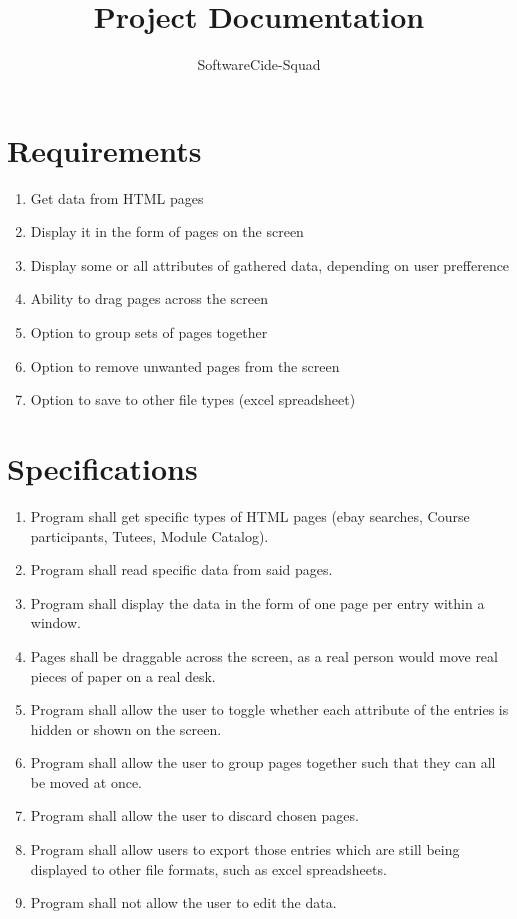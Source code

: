 \documentclass[12pt]{article}
\begin{document}
\title{Project Documentation}
\author{SoftwareCide-Squad}
\maketitle

\section{Requirements}
\begin{enumerate}
\item Get data from HTML pages
\item Display it in the form of pages on the screen
\item Display some or all attributes of gathered data, depending on user prefference
\item Ability to drag pages across the screen
\item Option to group sets of pages together
\item Option to remove unwanted pages from the screen
\item Option to save to other file types (excel spreadsheet)
\end{enumerate}

\section{Specifications}
\begin{enumerate}
\item Program shall get specific types of HTML pages (ebay searches, Course participants, Tutees, Module Catalog).
\item Program shall read specific data from said pages.
\item Program shall display the data in the form of one page per entry within a window.
\item Pages shall be draggable across the screen, as a real person would move real pieces of paper on a real desk.
\item Program shall allow the user to toggle whether each attribute of the entries is hidden or shown on the screen.
\item Program shall allow the user to group pages together such that they can all be moved at once.
\item Program shall allow the user to discard chosen pages.
\item Program shall allow users to export those entries which are still being displayed to other file formats, such as excel spreadsheets.
\item Program shall not allow the user to edit the data.
\end{enumerate}
\end{document}
